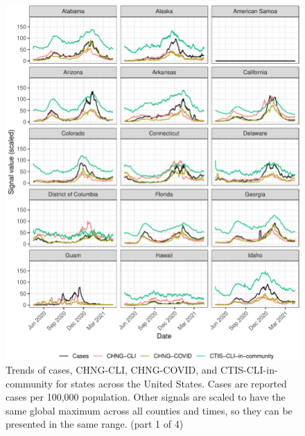\documentclass[9pt,twoside,lineno]{pnas-new}
\begin{document}
\begin{figure}

{\centering \includegraphics[width=\textwidth]{fig/state-trend-grids-1-1} 

}

\caption{Trends of cases, CHNG-CLI, CHNG-COVID, and CTIS-CLI-in-community for states across the United States. Cases are reported cases per 100,000 population. Other signals are scaled to have the same global maximum across all counties and times, so they can be presented in the same range. (part 1 of 4)}\label{fig:state-trend-grids-1}
\end{figure}

\clearpage
\end{document}
